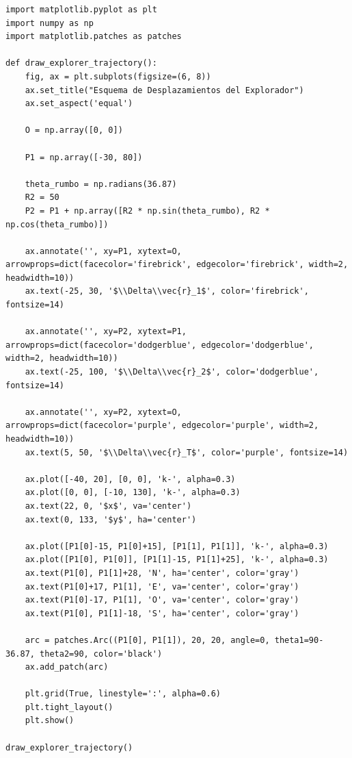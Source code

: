 \documentclass[12pt, a4paper]{article}
\begin{document}
\begin{lstlisting}
import matplotlib.pyplot as plt
import numpy as np
import matplotlib.patches as patches

def draw_explorer_trajectory():
    fig, ax = plt.subplots(figsize=(6, 8))
    ax.set_title("Esquema de Desplazamientos del Explorador")
    ax.set_aspect('equal')
    
    O = np.array([0, 0])
    
    P1 = np.array([-30, 80])
    
    theta_rumbo = np.radians(36.87)
    R2 = 50
    P2 = P1 + np.array([R2 * np.sin(theta_rumbo), R2 * np.cos(theta_rumbo)])
    
    ax.annotate('', xy=P1, xytext=O, arrowprops=dict(facecolor='firebrick', edgecolor='firebrick', width=2, headwidth=10))
    ax.text(-25, 30, '$\\Delta\\vec{r}_1$', color='firebrick', fontsize=14)
    
    ax.annotate('', xy=P2, xytext=P1, arrowprops=dict(facecolor='dodgerblue', edgecolor='dodgerblue', width=2, headwidth=10))
    ax.text(-25, 100, '$\\Delta\\vec{r}_2$', color='dodgerblue', fontsize=14)
    
    ax.annotate('', xy=P2, xytext=O, arrowprops=dict(facecolor='purple', edgecolor='purple', width=2, headwidth=10))
    ax.text(5, 50, '$\\Delta\\vec{r}_T$', color='purple', fontsize=14)
    
    ax.plot([-40, 20], [0, 0], 'k-', alpha=0.3)
    ax.plot([0, 0], [-10, 130], 'k-', alpha=0.3)
    ax.text(22, 0, '$x$', va='center')
    ax.text(0, 133, '$y$', ha='center')
    
    ax.plot([P1[0]-15, P1[0]+15], [P1[1], P1[1]], 'k-', alpha=0.3)
    ax.plot([P1[0], P1[0]], [P1[1]-15, P1[1]+25], 'k-', alpha=0.3)
    ax.text(P1[0], P1[1]+28, 'N', ha='center', color='gray')
    ax.text(P1[0]+17, P1[1], 'E', va='center', color='gray')
    ax.text(P1[0]-17, P1[1], 'O', va='center', color='gray')
    ax.text(P1[0], P1[1]-18, 'S', ha='center', color='gray')
    
    arc = patches.Arc((P1[0], P1[1]), 20, 20, angle=0, theta1=90-36.87, theta2=90, color='black')
    ax.add_patch(arc)
    
    plt.grid(True, linestyle=':', alpha=0.6)
    plt.tight_layout()
    plt.show()

draw_explorer_trajectory()
\end{lstlisting}
\end{document}
